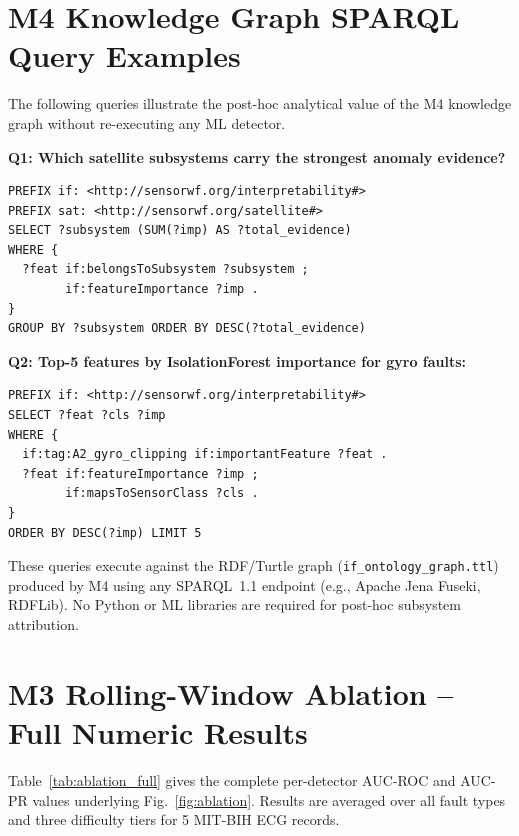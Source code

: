 \documentclass[conference]{IEEEtran}
\begin{document}
\section{M4 Knowledge Graph SPARQL Query Examples}
\label{app:sparql}

The following queries illustrate the post-hoc analytical value of the M4 knowledge graph without re-executing any ML detector.

\noindent\textbf{Q1: Which satellite subsystems carry the strongest anomaly evidence?}
\begin{lstlisting}[basicstyle=\ttfamily\scriptsize]
PREFIX if: <http://sensorwf.org/interpretability#>
PREFIX sat: <http://sensorwf.org/satellite#>
SELECT ?subsystem (SUM(?imp) AS ?total_evidence)
WHERE {
  ?feat if:belongsToSubsystem ?subsystem ;
        if:featureImportance ?imp .
}
GROUP BY ?subsystem ORDER BY DESC(?total_evidence)
\end{lstlisting}

\noindent\textbf{Q2: Top-5 features by IsolationForest importance for gyro faults:}
\begin{lstlisting}[basicstyle=\ttfamily\scriptsize]
PREFIX if: <http://sensorwf.org/interpretability#>
SELECT ?feat ?cls ?imp
WHERE {
  if:tag:A2_gyro_clipping if:importantFeature ?feat .
  ?feat if:featureImportance ?imp ;
        if:mapsToSensorClass ?cls .
}
ORDER BY DESC(?imp) LIMIT 5
\end{lstlisting}

These queries execute against the RDF/Turtle graph (\texttt{if\_ontology\_graph.ttl}) produced by M4 using any SPARQL~1.1 endpoint (e.g., Apache Jena Fuseki, RDFLib). No Python or ML libraries are required for post-hoc subsystem attribution.

\section{M3 Rolling-Window Ablation -- Full Numeric Results}
\label{app:ablation}

Table~\ref{tab:ablation_full} gives the complete per-detector AUC-ROC and AUC-PR values underlying Fig.~\ref{fig:ablation}. Results are averaged over all fault types and three difficulty tiers for 5 MIT-BIH ECG records.
\end{document}
